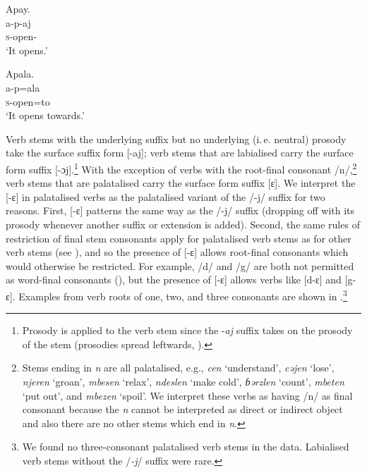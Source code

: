 \ea \label{ex:6:5}
Apay.\\
\gll  a-p-aj\\
      \textsc{s}-open-{\CL}\\
\glt  ‘It opens.’
\z

\clearpage
\ea \label{ex:6:6}
Apala.\\
\gll  a-p=ala\\
      \textsc{s}-open=to\\
\glt  ‘It opens towards.’
\z

Verb stems with the underlying suffix but no underlying (i.\,e. neutral) prosody take the surface suffix form [{}-aj]; verb stems that are labialised carry the surface form suffix [{}-ɔj].\footnote{Prosody is applied to the verb stem since the -\textit{aj} suffix takes on the prosody of the stem (prosodies spread leftwards, ).} With the exception of verbs with the root-final consonant /n/,\footnote{Stems ending in \textit{n} are all palatalised, e.g., \textit{cen} ‘understand’, \textit{cəjen} ‘lose’, \textit{njeren} ‘groan’, \textit{mbesen} ‘relax’, \textit{ndeslen} ‘make cold’, \textit{ɓərzlen} ‘count’, \textit{mbeten} ‘put out’, and \textit{mbezen} ‘spoil’.  We interpret these verbs as having /n/ as final consonant because the \textit{n} cannot be interpreted as direct or indirect object and also there are no other stems which end in \textit{n}. } verb stems that are palatalised carry the surface form suffix [{}ɛ]. We interpret the [{}-ɛ] in palatalised verbs as the palatalised variant of the /-j/ suffix for two reasons. First, [{}-ɛ] patterns the same way as the /-j/ suffix (dropping off with its prosody whenever another suffix or extension is added). Second, the same rules of restriction of final stem consonants apply for palatalised verb stems as for other verb stems (see ), and so the presence of [{}-ɛ]  allows root-final consonants which would otherwise be restricted. For example, /d/ and /g/ are both not permitted as word-final consonants (), but the presence of [{}-ɛ] allows verbs like [d-ɛ]  and [g-ɛ]. Examples from verb roots of one, two, and three consonants are shown in .\footnote{We found no three-consonant palatalised verb stems in the data. Labialised verb stems without the /\textit{{}-j}/ suffix were rare.}

